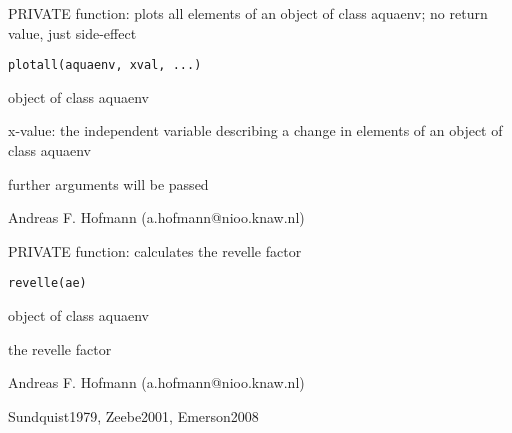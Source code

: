 \documentclass{article}
\begin{document}
\begin{Description}\relax
PRIVATE function: plots all elements of an object of class aquaenv; no return value, just side-effect
\end{Description}
\begin{Usage}
\begin{verbatim}plotall(aquaenv, xval, ...)\end{verbatim}
\end{Usage}
\begin{Arguments}
\begin{ldescription}
\item[\code{aquaenv }] object of class aquaenv
\item[\code{xval }] x-value: the independent variable describing a change in elements of an object of class aquaenv
\item[\code{... }] further arguments will be passed
\end{ldescription}
\end{Arguments}
\begin{Author}\relax
Andreas F. Hofmann (a.hofmann@nioo.knaw.nl)
\end{Author}

\begin{Description}\relax
PRIVATE function: calculates the revelle factor
\end{Description}
\begin{Usage}
\begin{verbatim}revelle(ae)\end{verbatim}
\end{Usage}
\begin{Arguments}
\begin{ldescription}
\item[\code{ae }] object of class aquaenv
\end{ldescription}
\end{Arguments}
\begin{Value}
the revelle factor
\end{Value}
\begin{Author}\relax
Andreas F. Hofmann (a.hofmann@nioo.knaw.nl)
\end{Author}
\begin{References}\relax
Sundquist1979, Zeebe2001, Emerson2008
\end{References}
\end{document}
